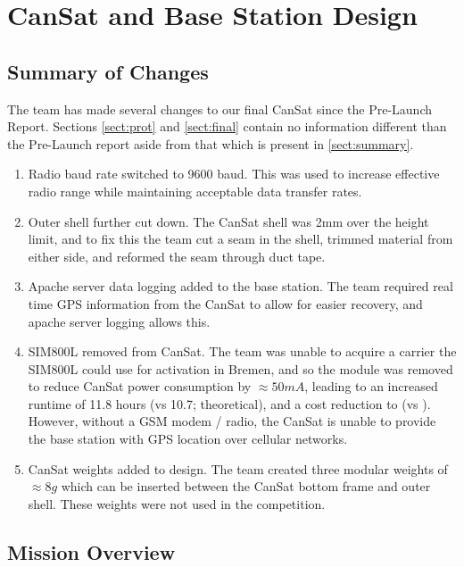 \documentclass[]{report}
\begin{document}
	\chapter{CanSat and Base Station Design}
		\section{Summary of Changes}
		\label{sect:summary}
		The team has made several changes to our final CanSat since the Pre-Launch Report. Sections \autoref{sect:prot} and \autoref{sect:final} contain no information different than the Pre-Launch report aside from that which is present in \autoref{sect:summary}.
		\begin{enumerate}
			\item Radio baud rate switched to 9600 baud. This was used to increase effective radio range while maintaining acceptable data transfer rates. \\
			\item Outer shell further cut down. The CanSat shell was 2mm over the height limit, and to fix this the team cut a seam in the shell, trimmed material from either side, and reformed the seam through duct tape. \\
			\item Apache server data logging added to the base station. The team required real time GPS information from the CanSat to allow for easier recovery, and apache server logging allows this. \\
			\item SIM800L removed from CanSat. The team was unable to acquire a carrier the SIM800L could use for activation in Bremen, and so the module was removed to reduce CanSat power consumption by $\approx50mA$, leading to an increased runtime of 11.8 hours (vs 10.7; theoretical), and a cost reduction to  (vs ). However, without a GSM modem / radio, the CanSat is unable to provide the base station with GPS location over cellular networks. \\
			\item CanSat weights added to design. The team created three modular weights of $\approx8g$ which can be inserted between the CanSat bottom frame and outer shell. These weights were not used in the competition. \\
		\end{enumerate}
		
		\section{Mission Overview}
\end{document}
